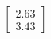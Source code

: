 \documentclass[preview]{standalone}
\begin{document}
\begin{align*}
\begin{bmatrix} 2.63 \\ 3.43 \end{bmatrix}
\end{align*}
\end{document}
